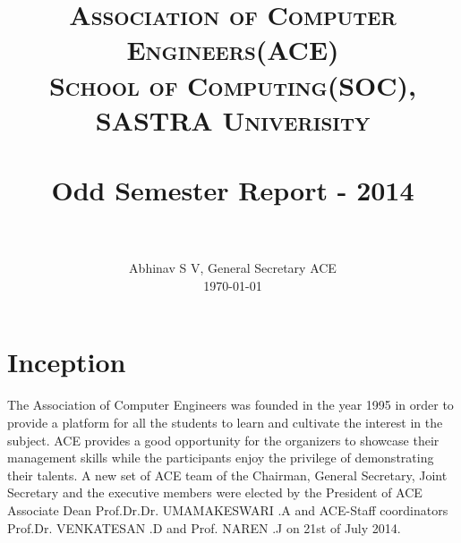 \documentclass[paper=a4, fontsize=11pt]{scrartcl}
\title{
		\usefont{OT1}{bch}{b}{n}
		\normalfont \huge \textsc{Association of Computer Engineers(ACE)} \\ [25pt]
        \normalfont \normalsize \textsc{School of Computing(SOC), SASTRA Univerisity} \\ [25pt]
		\horrule{0.5pt} \\[0.4cm]
		\huge Odd Semester Report - 2014 \\
		\horrule{2pt} \\[0.5cm]
}
\author{
		\normalfont 								\normalsize
        Abhinav S V,
        General Secretary ACE\\[-3pt]		\normalsize
        \today
}
\date{}
\numberwithin{equation}{section}		%
\numberwithin{figure}{section}			%
\numberwithin{table}{section}				%
\begin{document}
\maketitle
\section{Inception}
  The Association of Computer Engineers was founded in the year 1995 in order to provide a platform for all the students to learn and cultivate the interest in the subject.  
  ACE provides a good opportunity for the organizers to showcase their management skills while the participants enjoy the privilege of demonstrating their talents.
  A new set of ACE team of the Chairman, General Secretary, Joint Secretary and the executive members were elected by the President of ACE Associate Dean Prof.Dr.Dr. UMAMAKESWARI .A and ACE-Staff coordinators Prof.Dr. VENKATESAN .D and Prof. NAREN .J on 21st of July 2014.
\end{document}
